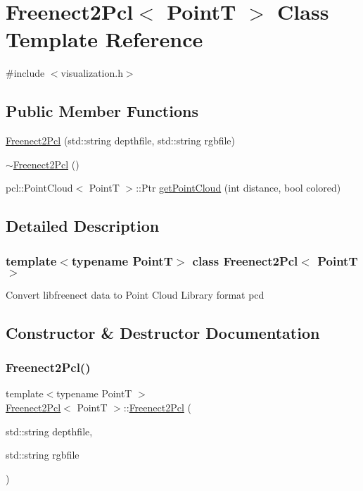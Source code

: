 \hypertarget{class_freenect2_pcl}{}\section{Freenect2\+Pcl$<$ PointT $>$ Class Template Reference}
\label{class_freenect2_pcl}


{\ttfamily \#include $<$visualization.\+h$>$}

\subsection*{Public Member Functions}
\begin{DoxyCompactItemize}
\item 
\hyperlink{class_freenect2_pcl_a5450c10f4c3b3df466933190ac6e667b}{Freenect2\+Pcl} (std\+::string depthfile, std\+::string rgbfile)
\item 
\hyperlink{class_freenect2_pcl_a7338d384068fbee44f6445490aeab02e}{$\sim$\+Freenect2\+Pcl} ()
\item 
pcl\+::\+Point\+Cloud$<$ PointT $>$\+::Ptr \hyperlink{class_freenect2_pcl_ac3a7b3b22af70e5e3133032fea623249}{get\+Point\+Cloud} (int distance, bool colored)
\end{DoxyCompactItemize}


\subsection{Detailed Description}
\subsubsection*{template$<$typename PointT$>$\newline
class Freenect2\+Pcl$<$ Point\+T $>$}

Convert libfreenect data to Point Cloud Library format pcd 

\subsection{Constructor \& Destructor Documentation}
\hypertarget{class_freenect2_pcl_a5450c10f4c3b3df466933190ac6e667b}{}\label{class_freenect2_pcl_a5450c10f4c3b3df466933190ac6e667b} 
\subsubsection{\texorpdfstring{Freenect2\+Pcl()}{Freenect2Pcl()}}
{\footnotesize\ttfamily template$<$typename PointT $>$ \\
\hyperlink{class_freenect2_pcl}{Freenect2\+Pcl}$<$ PointT $>$\+::\hyperlink{class_freenect2_pcl}{Freenect2\+Pcl} (\begin{DoxyParamCaption}\item[{std\+::string}]{depthfile,  }\item[{std\+::string}]{rgbfile }\end{DoxyParamCaption})\hspace{0.3cm}{\ttfamily [inline]}}

